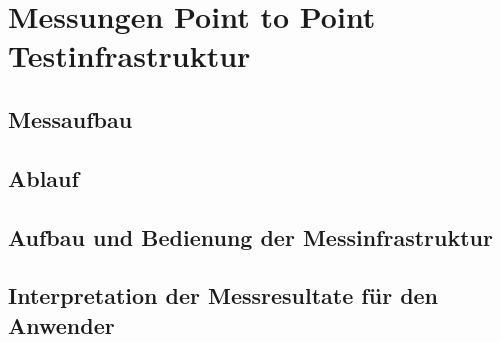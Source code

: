 \clearpage
\section{Messungen Point to Point Testinfrastruktur}\label{sec:MessungenPointtoPointTestinfrastruktur}

\subsection{Messaufbau}\label{sec:Messaufbau}

\subsection{Ablauf}\label{sec:Ablauf}

\subsection{Aufbau und Bedienung der Messinfrastruktur}\label{sec:AufbauundBedienungderMessinfrastruktur}

\subsection{Interpretation der Messresultate für den Anwender}\label{sec:InterpretationderMessresultatefürdenAnwender}